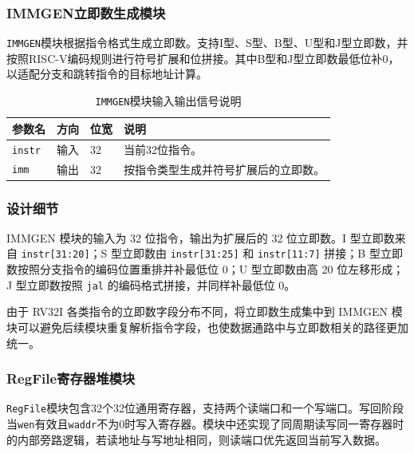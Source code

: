 \documentclass[UTF8,a4paper,12pt]{ctexart}
\newcommand{\code}[1]{\texttt{#1}}
\begin{document}
\subsubsection{IMMGEN立即数生成模块}

\code{IMMGEN}模块根据指令格式生成立即数。支持I型、S型、B型、U型和J型立即数，并按照RISC-V编码规则进行符号扩展和位拼接。其中B型和J型立即数最低位补0，以适配分支和跳转指令的目标地址计算。

\begin{table}[H]
\centering
\caption{\code{IMMGEN}模块输入输出信号说明}
\footnotesize
\renewcommand{\arraystretch}{1.15}
\begin{tabularx}{\textwidth}{p{3.2cm}p{1.5cm}p{2.1cm}X}
\toprule
参数名 & 方向 & 位宽 & 说明 \\
\midrule
\code{instr} & 输入 & 32 & 当前32位指令。 \\
\code{imm} & 输出 & 32 & 按指令类型生成并符号扩展后的立即数。 \\
\bottomrule
\end{tabularx}
\end{table}

\subsubsection*{设计细节}

IMMGEN 模块的输入为 32 位指令，输出为扩展后的 32 位立即数。I 型立即数来自 \code{instr[31:20]}；S 型立即数由 \code{instr[31:25]} 和 \code{instr[11:7]} 拼接；B 型立即数按照分支指令的编码位置重排并补最低位 0；U 型立即数由高 20 位左移形成；J 型立即数按照 \code{jal} 的编码格式拼接，并同样补最低位 0。

由于 RV32I 各类指令的立即数字段分布不同，将立即数生成集中到 IMMGEN 模块可以避免后续模块重复解析指令字段，也使数据通路中与立即数相关的路径更加统一。

\subsubsection{RegFile寄存器堆模块}

\code{RegFile}模块包含32个32位通用寄存器，支持两个读端口和一个写端口。写回阶段当\code{wen}有效且\code{waddr}不为0时写入寄存器。模块中还实现了同周期读写同一寄存器时的内部旁路逻辑，若读地址与写地址相同，则读端口优先返回当前写入数据。
\end{document}
